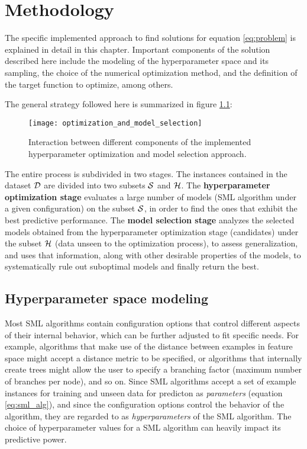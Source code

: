 \chapter{Methodology}
	The specific implemented approach to find solutions for equation \ref{eq:problem} is explained
	in detail in this chapter. Important components of the solution described here include the
	modeling of the hyperparameter space and its sampling, the choice of the numerical optimization
	method, and the definition of the target function to optimize, among others.

	The general strategy followed here is summarized in figure \ref{fig:generalapproach}:

	\begin{figure}[here]
		\begin{center}
			\texttt{[image: optimization\_and\_model\_selection]}
		\end{center}
		\caption[General methodology diagram]{Interaction between different components of the
		implemented hyperparameter optimization and model selection approach.}
		\label{fig:generalapproach}
	\end{figure}


	The entire process is subdivided in two stages. The instances contained in the dataset
	$\mathcal{D}$ are divided into two subsets $\mathcal{S}$ and $\mathcal{H}$. The {\bf
	hyperparameter optimization stage} evaluates a large number of models (SML algorithm under a
	given configuration) on the subset $\mathcal{S}$, in order to find the ones that exhibit the best
	predictive performance. The {\bf model selection stage} analyzes the selected models obtained
	from the hyperparameter optimization stage (candidates) under the subset $\mathcal{H}$ (data unseen to the
	optimization process), to assess
	generalization, and uses that information, along with other desirable properties of the models,
	to systematically rule out suboptimal models and finally return the best.


\section{Hyperparameter space modeling}
	\label{sec:hyperparam_dist}
	Most SML algorithms contain configuration options that control different aspects of their
	internal behavior, which can be further adjusted to fit specific needs. For example, algorithms
	that make use of the distance between examples in feature space might accept a distance metric
	to be specified, or algorithms that internally create trees might allow the user to specify a
	branching factor (maximum number of branches per node), and so on. Since SML algorithms accept
	a set of example instances for training and unseen data for predicton as \emph{parameters} 
	(equation \ref{eq:sml_alg}), and since the configuration options control the behavior of the
	algorithm, they are regarded to as \emph{hyperparameters} of the SML algorithm. The choice of
	hyperparameter values for a SML algorithm can heavily impact its predictive power.

